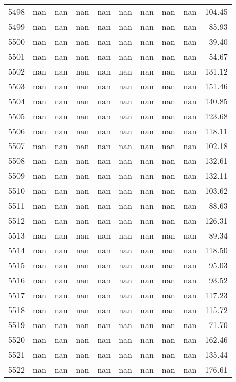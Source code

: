 \begin{tabular}{lrrrrrrrrr}
5498 & nan & nan & nan & nan & nan & nan & nan & nan & 104.45 \\
5499 & nan & nan & nan & nan & nan & nan & nan & nan & 85.93 \\
5500 & nan & nan & nan & nan & nan & nan & nan & nan & 39.40 \\
5501 & nan & nan & nan & nan & nan & nan & nan & nan & 54.67 \\
5502 & nan & nan & nan & nan & nan & nan & nan & nan & 131.12 \\
5503 & nan & nan & nan & nan & nan & nan & nan & nan & 151.46 \\
5504 & nan & nan & nan & nan & nan & nan & nan & nan & 140.85 \\
5505 & nan & nan & nan & nan & nan & nan & nan & nan & 123.68 \\
5506 & nan & nan & nan & nan & nan & nan & nan & nan & 118.11 \\
5507 & nan & nan & nan & nan & nan & nan & nan & nan & 102.18 \\
5508 & nan & nan & nan & nan & nan & nan & nan & nan & 132.61 \\
5509 & nan & nan & nan & nan & nan & nan & nan & nan & 132.11 \\
5510 & nan & nan & nan & nan & nan & nan & nan & nan & 103.62 \\
5511 & nan & nan & nan & nan & nan & nan & nan & nan & 88.63 \\
5512 & nan & nan & nan & nan & nan & nan & nan & nan & 126.31 \\
5513 & nan & nan & nan & nan & nan & nan & nan & nan & 89.34 \\
5514 & nan & nan & nan & nan & nan & nan & nan & nan & 118.50 \\
5515 & nan & nan & nan & nan & nan & nan & nan & nan & 95.03 \\
5516 & nan & nan & nan & nan & nan & nan & nan & nan & 93.52 \\
5517 & nan & nan & nan & nan & nan & nan & nan & nan & 117.23 \\
5518 & nan & nan & nan & nan & nan & nan & nan & nan & 115.72 \\
5519 & nan & nan & nan & nan & nan & nan & nan & nan & 71.70 \\
5520 & nan & nan & nan & nan & nan & nan & nan & nan & 162.46 \\
5521 & nan & nan & nan & nan & nan & nan & nan & nan & 135.44 \\
5522 & nan & nan & nan & nan & nan & nan & nan & nan & 176.61 \\

\end{tabular}
